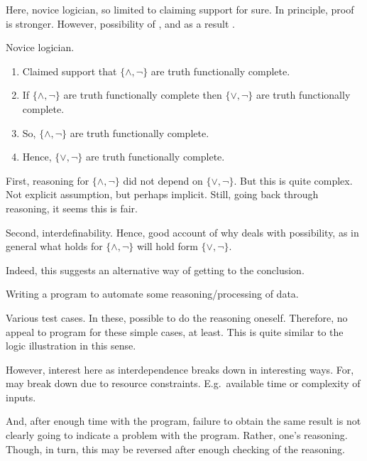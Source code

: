 \begin{note}[Logician]
  Here, novice logician, so limited to claiming support for sure.
  In principle, proof is stronger.
  However, possibility of \mistaken{}, and as a result \misled{}.
  \begin{illustration}\label{illu:CS:tfc}
    Novice logician.
    \begin{enumerate}
    \item Claimed support that \(\{\land,\lnot\}\) are truth functionally complete.
    \item If \(\{\land,\lnot\}\) are truth functionally complete then \(\{\lor,\lnot\}\) are truth functionally complete.
    \item So, \(\{\land,\lnot\}\) are truth functionally complete.
    \item Hence, \(\{\lor,\lnot\}\) are truth functionally complete.
    \end{enumerate}
  \end{illustration}

  First, reasoning for \(\{\land,\lnot\}\) did not depend on \(\{\lor,\lnot\}\).
  But this is quite complex.
  Not explicit assumption, but perhaps implicit.
  Still, going back through reasoning, it seems this is fair.

  Second, interdefinability.
  Hence, good account of why deals with possibility, as in general what holds for \(\{\land,\lnot\}\) will hold form \(\{\lor,\lnot\}\).

  Indeed, this suggests an alternative way of getting to the conclusion.
\end{note}

\begin{note}[Programming]
  \begin{illustration}
    \label{illu:programming}
    Writing a program to automate some reasoning/processing of data.
  \end{illustration}
  Various test cases.
  In these, possible to do the reasoning oneself.
  Therefore, no appeal to program for these simple cases, at least.
  This is quite similar to the logic illustration in this sense.

  However, interest here as interdependence breaks down in interesting ways.
  For, may break down due to resource constraints.
  E.g.\ available time or complexity of inputs.

  And, after enough time with the program, failure to obtain the same result is not clearly going to indicate a problem with the program.
  Rather, one's reasoning.
  Though, in turn, this may be reversed after enough checking of the reasoning.
\end{note}

